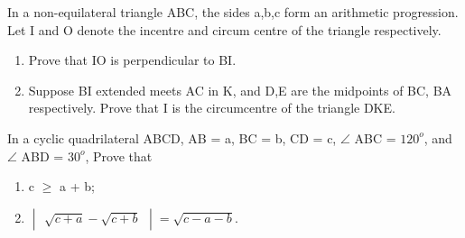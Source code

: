 \item In a non-equilateral triangle ABC, the sides a,b,c form an arithmetic progression. Let I and O denote the incentre and circum centre of the triangle respectively.
\begin{enumerate}
\item Prove that IO is perpendicular to BI.
\item Suppose BI extended meets AC in K, and D,E are the midpoints of BC, BA respectively. Prove that I is the circumcentre of the triangle DKE.
\end{enumerate}

\item In a cyclic quadrilateral ABCD, AB =  a, BC = b, CD = c, $\angle$ ABC = $120^{o}$, and  $\angle$ ABD = $30^{o}$, Prove that
\begin{enumerate}
\item c $\geq$ a + b;
\item $\begin{vmatrix} \sqrt{c + a} - \sqrt{c + b} \end{vmatrix}  = \sqrt{c - a - b}$.
\end{enumerate}






















